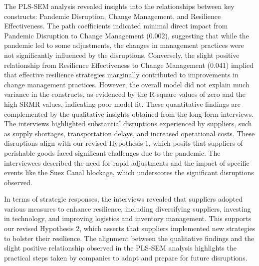 The PLS-SEM analysis revealed insights into the relationships between key constructs: Pandemic Disruption, Change Management, and Resilience Effectiveness. The path coefficients indicated minimal direct impact from Pandemic Disruption to Change Management (0.002), suggesting that while the pandemic led to some adjustments, the changes in management practices were not significantly influenced by the disruptions. Conversely, the slight positive relationship from Resilience Effectiveness to Change Management (0.041) implied that effective resilience strategies marginally contributed to improvements in change management practices. However, the overall model did not explain much variance in the constructs, as evidenced by the R-square values of zero and the high SRMR values, indicating poor model fit. These quantitative findings are complemented by the qualitative insights obtained from the long-form interviews. The interviews highlighted substantial disruptions experienced by suppliers, such as supply shortages, transportation delays, and increased operational costs. These disruptions align with our revised Hypothesis 1, which posits that suppliers of perishable goods faced significant challenges due to the pandemic. The interviewees described the need for rapid adjustments and the impact of specific events like the Suez Canal blockage, which underscores the significant disruptions observed.

In terms of strategic responses, the interviews revealed that suppliers adopted various measures to enhance resilience, including diversifying suppliers, investing in technology, and improving logistics and inventory management. This supports our revised Hypothesis 2, which asserts that suppliers implemented new strategies to bolster their resilience. The alignment between the qualitative findings and the slight positive relationship observed in the PLS-SEM analysis highlights the practical steps taken by companies to adapt and prepare for future disruptions.




